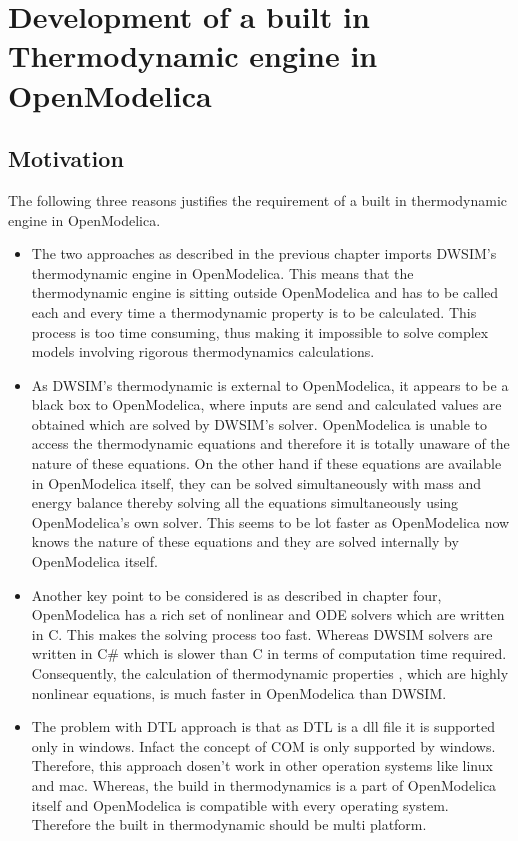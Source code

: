 \documentclass[12pt]{report}
\begin{document}
\chapter{Development of a built in Thermodynamic engine in OpenModelica}

\section{Motivation}

The following three reasons justifies the requirement of a built in thermodynamic engine in OpenModelica.

\begin{itemize}

\item The two approaches as described in the previous chapter imports DWSIM's thermodynamic engine in OpenModelica. This means that the thermodynamic engine is sitting outside OpenModelica and has to be called each and every time a thermodynamic property is to be calculated. This process is too time consuming, thus making it impossible to solve complex models involving rigorous thermodynamics calculations. 

\item As DWSIM's thermodynamic is external to OpenModelica, it appears to be a black box to OpenModelica, where inputs are send and calculated values are obtained which are solved by DWSIM's solver. OpenModelica is unable to access the thermodynamic equations and therefore it is totally unaware of the nature of these equations. On the other hand if these equations are available in OpenModelica itself, they can be solved simultaneously with mass and energy balance thereby solving all the equations simultaneously using OpenModelica's own solver. This seems to be lot faster as OpenModelica now knows the nature of these equations and they are solved internally by OpenModelica itself.

\item Another key point to be considered is as described in chapter four, OpenModelica has a rich set of nonlinear and ODE solvers which are written in C. This makes the solving process too fast. Whereas DWSIM solvers are written in C\# which is slower than C in terms of computation time required. Consequently, the calculation of thermodynamic properties , which are highly nonlinear equations, is much faster in OpenModelica than DWSIM. 

\item The problem with DTL approach is that as DTL is a dll file it is supported only in windows. Infact the concept of COM is only supported by windows. Therefore, this approach dosen't work in other operation systems like linux and mac. Whereas, the build in thermodynamics is a part of OpenModelica itself and OpenModelica is compatible with every operating system. Therefore the built in thermodynamic should be multi platform.

\end{itemize}
\end{document}
